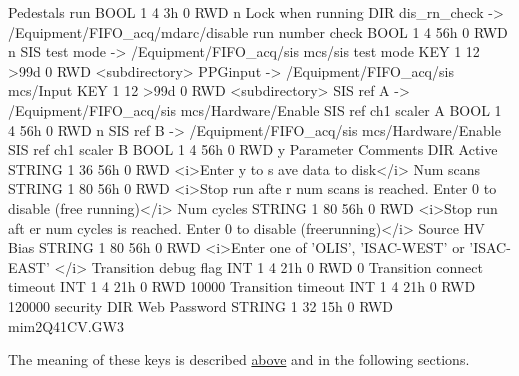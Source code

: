 \begin{DoxyCode}
        Pedestals run           BOOL    1     4     3h   0   RWD  n
    Lock when running           DIR
        dis_rn_check -> /Equipment/FIFO_acq/mdarc/disable run number check
                                BOOL    1     4     56h  0   RWD  n
        SIS test mode -> /Equipment/FIFO_acq/sis mcs/sis test mode
                                KEY     1     12    >99d 0   RWD  <subdirectory>
        PPGinput -> /Equipment/FIFO_acq/sis mcs/Input
                                KEY     1     12    >99d 0   RWD  <subdirectory>
        SIS ref A -> /Equipment/FIFO_acq/sis mcs/Hardware/Enable SIS ref ch1 
      scaler A
                                BOOL    1     4     56h  0   RWD  n
        SIS ref B -> /Equipment/FIFO_acq/sis mcs/Hardware/Enable SIS ref ch1 
      scaler B
                                BOOL    1     4     56h  0   RWD  y
    Parameter Comments          DIR
        Active                  STRING  1     36    56h  0   RWD  <i>Enter y to s
      ave data to disk</i>
        Num scans               STRING 1     80    56h  0   RWD  <i>Stop run afte
      r num scans is reached. Enter 0 to disable (free running)</i>
        Num cycles              STRING  1     80    56h  0   RWD  <i>Stop run aft
      er num cycles is reached. Enter 0 to disable (freerunning)</i>
        Source HV Bias          STRING  1     80    56h  0   RWD  <i>Enter one of
       'OLIS', 'ISAC-WEST' or 'ISAC-EAST' </i>
    Transition debug flag       INT     1     4     21h  0   RWD  0
    Transition connect timeout  INT     1     4     21h  0   RWD  10000
    Transition timeout          INT     1     4     21h  0   RWD  120000
    security                    DIR
        Web Password            STRING  1     32    15h  0   RWD  mim2Q41CV.GW3
\end{DoxyCode}


The meaning of these keys is described \hyperlink{RC_customize_ODB_RC_Experiment_tree_keys}{above} and in the following sections.

